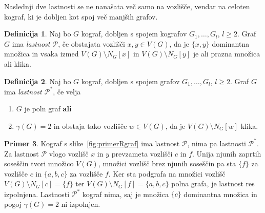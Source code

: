 \documentclass[12pt,a4paper,twoside]{article}
\theoremstyle{definition} %
\newtheorem{definicija}{Definicija}[section]
\newtheorem{primer}[definicija]{Primer}
\theoremstyle{plain} %
\numberwithin{equation}{section}  %
\begin{document}
Naslednji dve lastnosti se ne nanašata več samo na vozlišče, vendar na celoten kograf, ki je dobljen kot spoj več manjših grafov.

\begin{definicija}Naj bo $G$ kograf, dobljen s spojem kografov $G_1, \dots, G_l$, $ l \geq 2$. Graf $G$ ima \emph{lastnost $\mathcal{P}$}, če obstajata vozlišči $x,y\in V(G)$, da je $\{x, y\}$ dominantna množica in vsaka izmed $V(G) \setminus N_G[x]$ in $V(G) \setminus N_G[y]$ je ali prazna množica ali klika.
\end{definicija}
\begin{definicija}Naj bo $G$ kograf, dobljen s spojem grafov $G_1, \dots, G_l$, $l \geq 2$. Graf $G$ ima \emph{lastnost $\mathcal{P}^*$}, če velja
\begin{enumerate}[label=($\roman*$)]
\item $G$ je poln graf \textbf{ali}
\item $\gamma(G) = 2$ in obstaja tako vozlišče $w \in V(G)$, da je $V(G) \setminus N_G[w]$ klika.
\end{enumerate}
\end{definicija}

\begin{primer}
Kograf s slike~\ref{fig:primerRgraf} ima lastnost $\mathcal{P}$, nima pa lastnosti $\mathcal{P^*}$.
Za lastnost $\mathcal{P}$ vlogo vozlišč $x$ in $y$ prevzameta vozlišči $c$ in $f$. Unija njunih zaprtih soseščin tvori množico $V(G)$, množici vozlišč brez njunih soseščin pa sta $\{f\}$ za vozlišče $c$ in $\{a, b, c\}$ za vozlišče $f$. Ker sta podgrafa na množici vozlišč $V(G) \setminus N_G[c] = \{f\}$  ter $V(G) \setminus N_G[f] = \{a, b, c\}$ polna grafa, je lastnost res izpolnjena.
Lastnosti $\mathcal{P^*}$ kograf nima, saj je množica $\{c\}$ dominantna množica in pogoj $\gamma(G)=2$ ni izpolnjen.
\end{primer}
\end{document}
